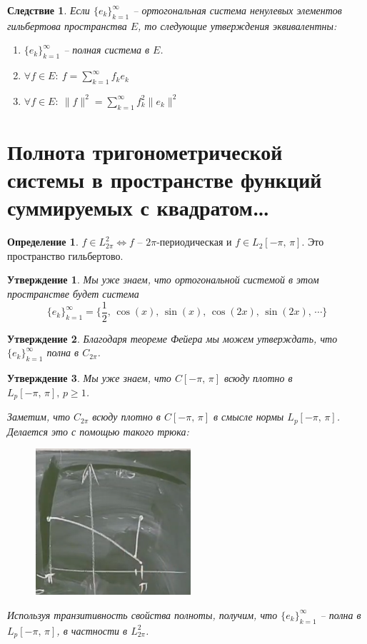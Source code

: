 \documentclass[a4paper,12pt]{article}
\renewcommand{\geq}{\ensuremath{\geqslant}}
\theoremstyle{plain}
\newtheorem{proposition}{Утверждение}[section]
\newtheorem*{corollary}{Следствие}
\theoremstyle{definition}
\newtheorem{definition}{Определение}[section]
\theoremstyle{remark}
\begin{document}
\begin{corollary}
	Если $\{e_k\}_{k = 1}^\infty$ -- ортогональная система ненулевых элементов гильбертова пространства $E$, то следующие утверждения эквивалентны:
	\begin{enumerate}
		\item $\{e_k\}_{k = 1}^\infty$ -- полная система в $E$.
		\item $\forall f \in E:\: f = \sum_{k = 1}^\infty f_ke_k$
		\item $\forall f \in E:\: \|f\|^2 = \sum_{k = 1}^\infty f_k^2\|e_k\|^2$
	\end{enumerate}
\end{corollary}

\section{Полнота тригонометрической системы в пространстве функций суммируемых с квадратом\dots}
\begin{definition}
	$f \in L_{2\pi}^2 \Leftrightarrow f$ -- $2\pi$-периодическая и $f \in L_2[-\pi,\,\pi]$. Это пространство гильбертово.
\end{definition}

\begin{proposition}
	Мы уже знаем, что ортогональной системой в этом пространстве будет система
	\[\{e_k\}_{k = 1}^\infty = \{\frac{1}{2},\, \cos(x),\,\sin(x),\,\cos(2x),\,\sin(2x),\,\cdots\}\]
\end{proposition}

\begin{proposition}
	Благодаря теореме Фейера мы можем утверждать, что $\{e_k\}_{k = 1}^\infty$ полна в $C_{2\pi}$.
\end{proposition}

\begin{proposition}
	Мы уже знаем, что $C[-\pi,\, \pi]$ всюду плотно в $L_p[-\pi,\,\pi],\, p \geq 1$.

	Заметим, что $C_{2\pi}$ всюду плотно в $C[-\pi,\,\pi]$ в смысле нормы $L_p[-\pi,\,\pi]$. Делается это с помощью такого трюка:
	\begin{figure}[h]
		\includegraphics[scale=0.5]{img/periodic_to_C.png}
	\end{figure}

	Используя транзитивность свойства полноты, получим, что $\{e_k\}_{k = 1}^\infty$ -- полна в $L_p[-\pi,\,\pi]$, в частности в $L_{2\pi}^2$.
\end{proposition}
\end{document}
